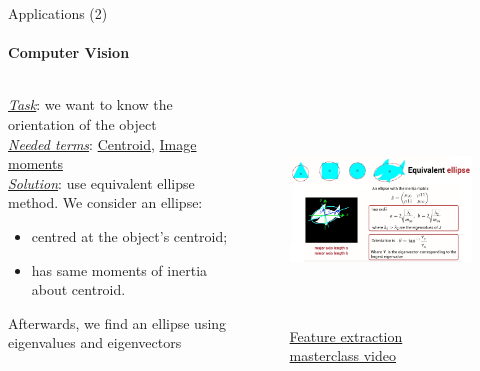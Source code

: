 \documentclass[aspectratio=169]{beamer}
\begin{document}
\begin{frame}[t]{Applications (2)}
\framesubtitle{Computer Vision}
\vspace{-0.3cm}
\begin{columns}[c,onlytextwidth]
    \begin{column}{0.40\textwidth}
        \textit{\underline{Task}}: we want to know the orientation of the object \\
\textit{\underline{Needed terms}}: \href{https://en.wikipedia.org/wiki/Centroid}{Centroid}, \href{https://www.youtube.com/watch?v=AAbUfZD_09s}{Image moments} \\
\textit{\underline{Solution}}: use equivalent ellipse method. We consider an ellipse:
\begin{itemize}
    \item centred at the object's centroid;
    \item has same moments of inertia about centroid.
\end{itemize}

Afterwards, we find an ellipse using eigenvalues and eigenvectors
    \end{column}
    \begin{column}{0.58\textwidth}
        \begin{figure}[H]
            \centering\includegraphics[height=6cm,width=1\textwidth,keepaspectratio]{cv.png}
            \caption*{\Large\href{https://robotacademy.net.au/masterclass/feature-extraction/?lesson=695}{Feature extraction masterclass video
            }}
            \label{fig:cv.png}
        \end{figure}
    \end{column}
\end{columns}

\end{frame}
\end{document}
